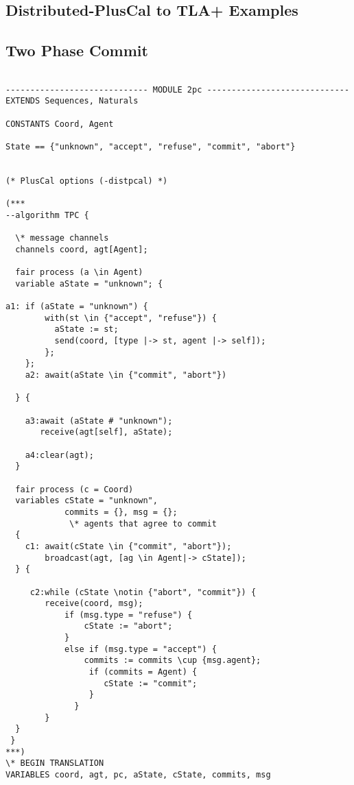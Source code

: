 \documentclass{thesul}
\begin{document}
\begin{appendices}
\chapter{Distributed-PlusCal to TLA+ Examples}
\section{Two Phase Commit}
\label{appendix:examples}

\begin{lstlisting}[caption = TLA+ translation for Sub-Processes, frame = tlrb, firstnumber = 1]

----------------------------- MODULE 2pc -----------------------------
EXTENDS Sequences, Naturals

CONSTANTS Coord, Agent

State == {"unknown", "accept", "refuse", "commit", "abort"}

    
(* PlusCal options (-distpcal) *)

(***
--algorithm TPC {
 
  \* message channels
  channels coord, agt[Agent];
     
  fair process (a \in Agent)
  variable aState = "unknown"; {

a1: if (aState = "unknown") {
        with(st \in {"accept", "refuse"}) {
          aState := st;
          send(coord, [type |-> st, agent |-> self]);
        };
    };
    a2: await(aState \in {"commit", "abort"})
    
  } {
    
    a3:await (aState # "unknown");
       receive(agt[self], aState); 
       
    a4:clear(agt);
  }

  fair process (c = Coord) 
  variables cState = "unknown",
            commits = {}, msg = {};
             \* agents that agree to commit
  {
    c1: await(cState \in {"commit", "abort"});    
        broadcast(agt, [ag \in Agent|-> cState]);
  } {
        
     c2:while (cState \notin {"abort", "commit"}) {
        receive(coord, msg);
            if (msg.type = "refuse") {
                cState := "abort";
            }
            else if (msg.type = "accept") {
                commits := commits \cup {msg.agent};
                 if (commits = Agent) {
                    cState := "commit";
                 }
              }
        }
  }
 }
***)
\* BEGIN TRANSLATION
VARIABLES coord, agt, pc, aState, cState, commits, msg


\end{lstlisting}
\end{appendices}
\end{document}
